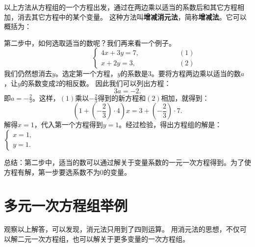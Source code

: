 \documentclass[12pt,UTF8]{ctexbook}
\begin{document}
以上方法从方程组的一个方程出发，通过在两边乘以适当的系数后和其它方程相加，消去其它方程中的某个变量。
这种方法叫\textbf{增减消元法}，简称\textbf{增减法}。它可以概括为：
\begin{center}
\end{center}

第二步中，如何选取适当的数呢？我们再来看一个例子。
$$ \quad \quad \quad \quad \quad\left\{
\begin{array}{cr}
     4x + 3y = 7, & \quad \quad \quad \quad \quad (1) \\
     x + 2y = 3, & \quad \quad \quad \quad \quad (2)
\end{array}\right.
$$
我们仍然想消去$y$。选定第一个方程，$y$的系数是$3$。要将方程两边乘以适当的数$a$，让$y$的系数变成$2$的相反数。
因此我们可以列出方程：
$$ 3a = -2.$$
即$a = -\frac{2}{3}$。这样，$(1)$乘以$-\frac23$得到的新方程和$(2)$相加，就得到：
$$ \left(1 + (-\frac{2}{3}) \cdot 4\right) x = 3 + (-\frac{2}{3}) \cdot 7.$$
解得$x = 1$，代入第一个方程得到$y = 1$。经过检验，得出方程组的解是：$\left\{ \begin{array}{c}
    x = 1, \\
    y = 1.
\end{array}\right.$

总结：第二步中，适当的数可以通过解关于变量系数的一元一次方程得到。为了使方程有解，第一步要选系数不为$0$的变量。

\section{多元一次方程组举例}
观察以上解答，可以发现，消元法只用到了四则运算。
用消元法的思想，不仅可以解二元一次方程组，也可以解关于更多变量的一次方程组。
\end{document}
